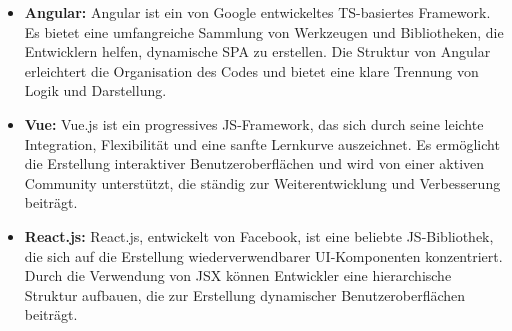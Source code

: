 \begin{itemize}

    \item \textbf{Angular:} Angular ist ein von Google entwickeltes \acl{TS}-basiertes Framework. Es bietet eine umfangreiche Sammlung von Werkzeugen und Bibliotheken, die Entwicklern helfen, dynamische \acf{SPA} zu erstellen. Die Struktur von Angular erleichtert die Organisation des Codes und bietet eine klare Trennung von Logik und Darstellung.\cite{angular}

    \item \textbf{Vue:} Vue.js ist ein progressives \acl{JS}-Framework, das sich durch seine leichte Integration, Flexibilität und eine sanfte Lernkurve auszeichnet. Es ermöglicht die Erstellung interaktiver Benutzeroberflächen und wird von einer aktiven Community unterstützt, die ständig zur Weiterentwicklung und Verbesserung beiträgt.\cite{vuejs}

    \item \textbf{React.js:} React.js, entwickelt von Facebook, ist eine beliebte \acl{JS}-Bibliothek, die sich auf die Erstellung wiederverwendbarer \acf{UI}-Komponenten konzentriert. Durch die Verwendung von \acf{JSX} können Entwickler eine hierarchische Struktur aufbauen, die zur Erstellung dynamischer Benutzeroberflächen beiträgt.\cite{reactjs}

\end{itemize}



